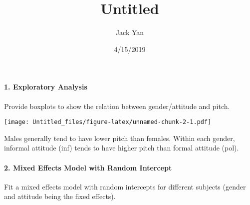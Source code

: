 \documentclass[]{article}
\title{Untitled}
\author{Jack Yan}
\date{4/15/2019}
\newenvironment{Shaded}{\begin{snugshade}}{\end{snugshade}}
\newcommand{\KeywordTok}[1]{\textcolor[rgb]{0.13,0.29,0.53}{\textbf{#1}}}
\newcommand{\DataTypeTok}[1]{\textcolor[rgb]{0.13,0.29,0.53}{#1}}
\newcommand{\StringTok}[1]{\textcolor[rgb]{0.31,0.60,0.02}{#1}}
\newcommand{\CommentTok}[1]{\textcolor[rgb]{0.56,0.35,0.01}{\textit{#1}}}
\newcommand{\OperatorTok}[1]{\textcolor[rgb]{0.81,0.36,0.00}{\textbf{#1}}}
\newcommand{\NormalTok}[1]{#1}
\let\oldparagraph\paragraph
\renewcommand{\paragraph}[1]{\oldparagraph{#1}\mbox{}}
\begin{document}
\maketitle

\begin{Shaded}
\end{Shaded}

\paragraph{1. Exploratory Analysis}\label{exploratory-analysis}

Provide boxplots to show the relation between gender/attitude and pitch.

\begin{Shaded}
\end{Shaded}

\texttt{[image: Untitled\_files/figure-latex/unnamed-chunk-2-1.pdf]}

Males generally tend to have lower pitch than females. Within each
gender, informal attitude (inf) tends to have higher pitch than formal
attitude (pol).

\paragraph{2. Mixed Effects Model with Random
Intercept}\label{mixed-effects-model-with-random-intercept}

Fit a mixed effects model with random intercepts for different subjects
(gender and attitude being the fixed effects).
\end{document}

